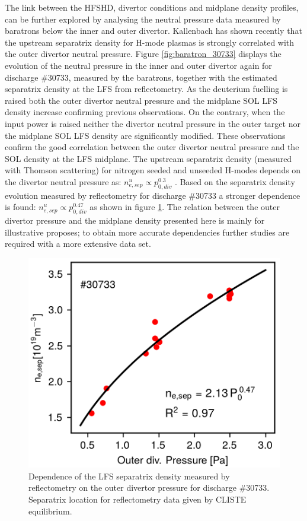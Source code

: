 \documentclass[12pt]{iopart}
\begin{document}
The link between the HFSHD, divertor conditions and midplane density profiles, can be further explored by analysing the neutral pressure data measured by baratrons below the inner and outer divertor. Kallenbach has shown recently\cite{kallenbach2018parameter} that the upstream separatrix density for H-mode plasmas is strongly correlated with the outer divertor neutral pressure. Figure \ref{fig:baratron_30733} displays the evolution of the neutral pressure in the inner and outer divertor again for discharge \#30733, measured by the baratrons, together with the estimated separatrix density at the LFS from reflectometry. As the deuterium fuelling is raised both the outer divertor neutral pressure and the midplane SOL LFS density increase confirming previous observations. On the contrary, when the input power is raised neither the divertor neutral pressure in the outer target nor the midplane SOL LFS density are significantly modified. These observations confirm the good correlation between the outer divertor neutral pressure and the SOL density at the LFS midplane. The upstream separatrix density (measured with Thomson scattering) for nitrogen seeded and unseeded H-modes depends on the divertor neutral pressure as: $n_{e,sep}^u \propto p_{0,div}^{0.3}$ 
\cite{kallenbach2018parameter}. Based on the separatrix density evolution measured by reflectometry for discharge \#30733 a stronger dependence is found: $n_{e,sep}^u \propto p_{0,div}^{0.47}$ as shown in figure \ref{fig:nsep_pzero}. The relation between the outer divertor pressure and the midplane density presented here is mainly for illustrative proposes; to obtain more accurate dependencies further studies are required with a more extensive data set.

\begin{figure}[!bt]
\centering
\includegraphics[]{Figure8.png}
\caption[Dependence of the LFS separatrix density on the outer divertor pressure for discharge \#30733.]{Dependence of the LFS separatrix density measured by reflectometry on the outer divertor pressure for discharge \#30733. Separatrix location for reflectometry data given by CLISTE equilibrium\cite{mccarthy1999cliste}.}
\label{fig:nsep_pzero}
\end{figure}
\end{document}
